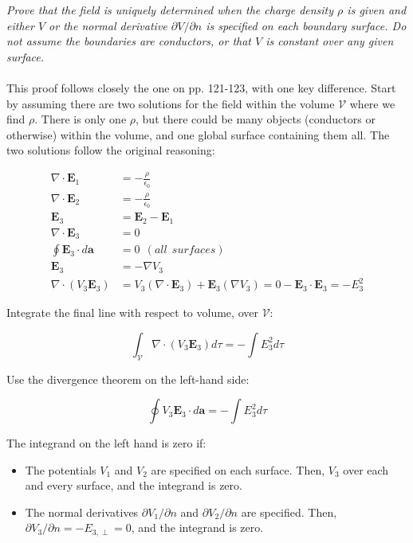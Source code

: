 \documentclass[10pt]{article}
\begin{document}
\textit{Prove that the field is uniquely determined when the charge density $\rho$ is given and either $V$ or the normal derivative $\partial V/ \partial n$ is specified on each boundary surface.  Do not assume the boundaries are conductors, or that $V$ is constant over any given surface.} \\ \\

This proof follows closely the one on pp. 121-123, with one key difference.  Start by assuming there are two solutions for the field within the volume $\mathcal{V}$ where we find $\rho$.  There is only one $\rho$, but there could be many objects (conductors or otherwise) within the volume, and one global surface containing them all.  The two solutions follow the original reasoning:

\begin{align}
\nabla \cdot \mathbf{E}_1 &= - \frac{\rho}{\epsilon_0} \\
\nabla \cdot \mathbf{E}_2 &= - \frac{\rho}{\epsilon_0} \\
\mathbf{E}_3 &= \mathbf{E}_2 - \mathbf{E}_1 \\
\nabla \cdot \mathbf{E}_3 &= 0 \\
\oint \mathbf{E}_3 \cdot d\mathbf{a} &= 0 ~~ (all ~~ surfaces) \\
\mathbf{E}_3 &= -\nabla V_3 \\
\nabla \cdot (V_3 \mathbf{E}_3) &= V_3 (\nabla \cdot \mathbf{E}_3) + \mathbf{E}_3 (\nabla V_3) = 0 - \mathbf{E}_3 \cdot \mathbf{E}_3 = - E_3^2
\end{align}

Integrate the final line with respect to volume, over $\mathcal{V}$:

\begin{equation}
\int_\mathcal{V} \nabla \cdot (V_3 \mathbf{E}_3) d\tau = -\int E_3^2 d\tau
\end{equation}

Use the divergence theorem on the left-hand side:

\begin{equation}
\oint V_3 \mathbf{E}_3 \cdot d\mathbf{a} = -\int E_3^2 d\tau
\end{equation}

The integrand on the left hand is zero if:

\begin{itemize}
\item The potentials $V_1$ and $V_2$ are specified on each surface.  Then, $V_3$ over each and every surface, and the integrand is zero.
\item The normal derivatives $\partial V_1 / \partial n$ and $\partial V_2 / \partial n$ are specified.  Then, $\partial V_3 / \partial n = -E_{3,\perp} = 0$, and the integrand is zero.
\end{itemize}
\end{document}
